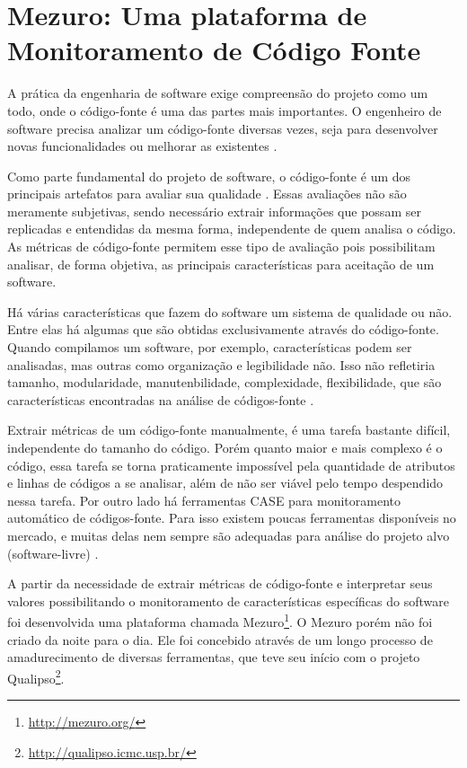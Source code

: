 \chapter{Mezuro: Uma plataforma de Monitoramento de Código Fonte}

A prática da engenharia de software exige compreensão do projeto como um todo, onde o código-fonte é uma das partes mais importantes. O engenheiro de software precisa analizar um código-fonte diversas vezes, seja para desenvolver novas funcionalidades ou melhorar as existentes \cite{meirelles2010mezuro}.

Como parte fundamental do projeto de software, o código-fonte é um dos principais artefatos para avaliar sua qualidade \cite{meirelles2009crab}. Essas avaliações não são meramente subjetivas, sendo necessário extrair informações que possam ser replicadas e entendidas da mesma forma, independente de quem analisa o código. As métricas de código-fonte permitem esse tipo de avaliação pois possibilitam analisar, de forma objetiva, as principais características para aceitação de um software.

Há várias características que fazem do software um sistema de qualidade ou não. Entre elas há algumas que são obtidas exclusivamente através do código-fonte. Quando compilamos um software, por exemplo, características podem ser analisadas, mas outras como organização e legibilidade não. Isso não refletiria tamanho, modularidade, manutenbilidade, complexidade, flexibilidade, que são características encontradas na análise de códigos-fonte \cite{meirelles2013metrics}.

Extrair métricas de um código-fonte manualmente, é uma tarefa bastante difícil, independente do tamanho do código. Porém quanto maior e mais complexo é o código, essa tarefa se torna praticamente impossível pela quantidade de atributos e linhas de códigos a se analisar, além de não ser viável pelo tempo despendido nessa tarefa. Por outro lado há ferramentas CASE para monitoramento automático de códigos-fonte. Para isso existem poucas ferramentas disponíveis no mercado, e muitas delas nem sempre são adequadas para análise do projeto alvo (software-livre) \cite{meirelles2010mezuro}.

A partir da necessidade de extrair métricas de código-fonte e interpretar seus valores possibilitando o monitoramento de características específicas do software foi desenvolvida uma plataforma chamada Mezuro\footnote{\url{http://mezuro.org/}}. O Mezuro porém não foi criado da noite para o dia. Ele foi concebido através de um longo processo de amadurecimento de diversas ferramentas, que teve seu início com o projeto Qualipso\footnote{\url{http://qualipso.icmc.usp.br/}}.

